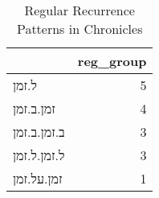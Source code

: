 \begin{table}[htbp!]
\centering
\caption{Regular Recurrence Patterns in Chronicles}
\label{table:regrec_chron}
\begin{tabular}{lr}
\toprule
{} &  reg\_group \\
\midrule
ל.זמן       &          5 \\
זמן.ב.זמן   &          4 \\
ב.זמן.ב.זמן &          3 \\
ל.זמן.ל.זמן &          3 \\
זמן.על.זמן  &          1 \\
\bottomrule
\end{tabular}
\end{table}
